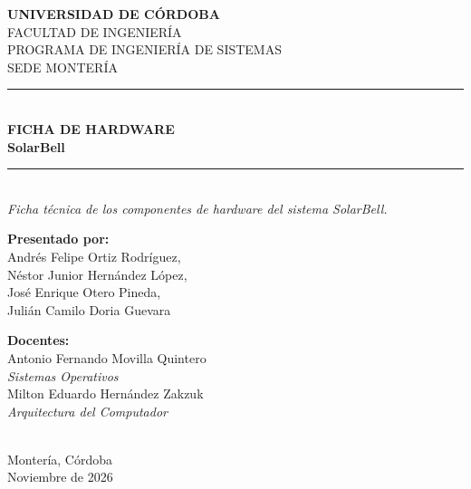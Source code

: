 \documentclass[12pt,letterpaper]{article}
\begin{document}
\begin{titlepage}
\centering
\vspace*{1cm}
{\Large \textbf{UNIVERSIDAD DE CÓRDOBA}}\\[0.3cm]
{\large FACULTAD DE INGENIERÍA}\\[0.2cm]
{\large PROGRAMA DE INGENIERÍA DE SISTEMAS}\\[0.2cm]
{\large SEDE MONTERÍA}\\[1.7cm]
\rule{\textwidth}{0.5pt}\\[0.3cm]
{\Huge \textbf{FICHA DE HARDWARE}}\\[0.4cm]
{\LARGE \textbf{SolarBell}}\\[0.3cm]
\rule{\textwidth}{0.5pt}\\[0.5cm]
{\large \textit{Ficha técnica de los componentes de hardware del sistema SolarBell.}}\\[2.5cm]
\begin{minipage}[t]{0.42\textwidth}
\begin{flushleft}
\textbf{Presentado por:}\\[0.2cm]
Andrés Felipe Ortiz Rodríguez,\\
Néstor Junior Hernández López,\\
José Enrique Otero Pineda,\\
Julián Camilo Doria Guevara
\end{flushleft}
\end{minipage}\hfill
\begin{minipage}[t]{0.52\textwidth}
\begin{flushright}
\textbf{Docentes:}\\[0.2cm]
Antonio Fernando Movilla Quintero\\
\textit{Sistemas Operativos}\\[0.3cm]
Milton Eduardo Hernández Zakzuk\\
\textit{Arquitectura del Computador}
\end{flushright}
\end{minipage}\\[2.5cm]
\vfill
Montería, Córdoba\\
Noviembre de 2026
\end{titlepage}
\newpage
{}\\[0.2cm]
\end{document}
